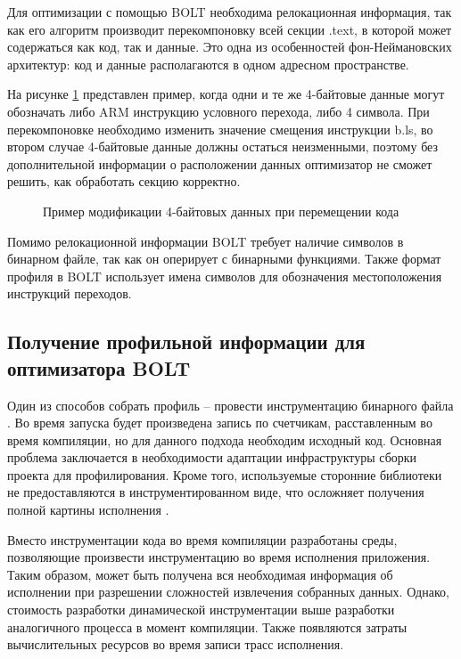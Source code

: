 Для оптимизации с помощью BOLT необходима релокационная информация, так как его алгоритм производит перекомпоновку всей секции .text, в которой может содержаться как код, так и данные. Это одна из особенностей фон-Неймановских архитектур: код и данные располагаются в одном адресном пространстве.

На рисунке \cref{fig:4byte} представлен пример, когда одни и те же 4-байтовые данные могут обозначать либо ARM инструкцию условного перехода, либо 4 символа. При перекомпоновке необходимо изменить значение смещения инструкции b.ls, во втором случае 4-байтовые данные должны остаться неизменными, поэтому без дополнительной информации о расположении данных оптимизатор не сможет решить, как обработать секцию корректно. 

\begin{figure}[!h]
    \centerfloat{
        \texttt{[image: 12]}
    }
    \caption{Пример модификации 4-байтовых данных при перемещении кода}\label{fig:4byte}
\end{figure}

Помимо релокационной информации BOLT требует наличие символов в бинарном файле, так как он оперирует с бинарными функциями. Также формат профиля в BOLT использует имена символов для обозначения местоположения инструкций переходов.

\subsection{Получение профильной информации для оптимизатора BOLT}\label{subsec:ch1/sec3/sub1}
Один из способов собрать профиль – провести инструментацию бинарного файла \cite{Ottoni2018}. Во время запуска будет произведена запись по счетчикам, расставленным во время компиляции, но для данного подхода необходим исходный код. Основная проблема заключается в необходимости адаптации инфраструктуры сборки проекта для профилирования. Кроме того, используемые сторонние библиотеки не предоставляются в инструментированном виде, что осложняет получения полной картины исполнения \cite{Nethercote2007}.

Вместо инструментации кода во время компиляции разработаны среды, позволяющие произвести инструментацию во время исполнения приложения. Таким образом, может быть получена вся необходимая информация об исполнении при разрешении сложностей извлечения собранных данных. Однако, стоимость разработки динамической инструментации выше разработки аналогичного процесса в момент компиляции. Также появляются затраты вычислительных ресурсов во время записи трасс исполнения.\cite{Li2007}

